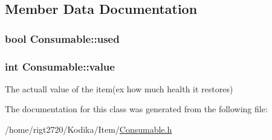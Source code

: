 \subsection{Member Data Documentation}
\hypertarget{classConsumable_a261f0f34c301027337ffe6bf32bf0200}{
\subsubsection[{used}]{\setlength{\rightskip}{0pt plus 5cm}bool Consumable\-::used\hspace{0.3cm}{\ttfamily [protected]}}}\label{classConsumable_a261f0f34c301027337ffe6bf32bf0200}
\hypertarget{classConsumable_a492024e0b8fd5b6c6e944116cbff3e32}{
\subsubsection[{value}]{\setlength{\rightskip}{0pt plus 5cm}int Consumable\-::value\hspace{0.3cm}{\ttfamily [protected]}}}\label{classConsumable_a492024e0b8fd5b6c6e944116cbff3e32}


The actuall value of the item(ex how much health it restores) 



The documentation for this class was generated from the following file\-:\begin{DoxyCompactItemize}
\item 
/home/rigt2720/\-Kodika/\-Item/\hyperlink{Consumable_8h}{Consumable.\-h}\end{DoxyCompactItemize}
